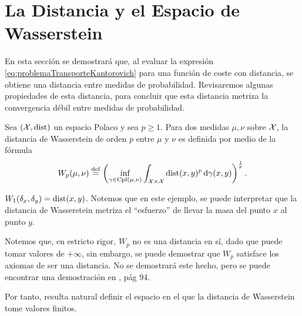 {{  }

  \section{La Distancia y el Espacio de Wasserstein}\label{sec:la-distancia-y-el-espacio-de-Wasserstein}
  {
	  En esta sección se demostrará que, al evaluar la expresión \eqref{eq:problemaTransporteKantorovich} para una función de coste con distancia, se obtiene una distancia entre medidas de probabilidad. Revisaremos algunas propiedades de esta distancia, para concluir que esta distancia metriza la convergencia débil entre medidas de probabilidad.

	  \begin{definition}\label{def:distanciaWasserstein}
		  Sea $(\cX, \dist)$ un espacio Polaco y sea $p \geq 1$. Para dos medidas $\mu, \nu$ sobre $\cX$, la distancia de Wasserstein de orden $p$ entre $\mu$ y $\nu$ es definida por medio de la fórmula
		  \begin{equation}
			  \label{eq:distanciaWasserstein}
			  \Wasserstein[p]{\mu}{\nu}  \eqdef \left( \inf_{\gamma \in \Cpl(\mu, \nu)} \int_{\cX \times \cX} \dist(x, y)^{p} \dgamma[x, y] \right)^{\frac{1}{p}}.
		  \end{equation}

	  \end{definition}

	  \begin{example}
		  $\Wasserstein[1]{\delta_x}{\delta_y} = \dist(x, y)$. Notemos que en este ejemplo, se puede interpretar que la distancia de Wasserstein metriza el ``esfuerzo'' de llevar la masa del punto $x$ al punto $y$.
	  \end{example}

	  Notemos que, en estricto rigor, $W_p$ no es una distancia en sí, dado que puede tomar valores de $+\infty$, sin embargo, se puede demostrar que $W_p$ satisface los axiomas de ser una distancia. No se demostrará este hecho, pero se puede encontrar una demostración en \cite{villani2009optimal}, pág 94.

	  Por tanto, resulta natural definir el espacio en el que la distancia de Wasserstein tome valores finitos.

}}
